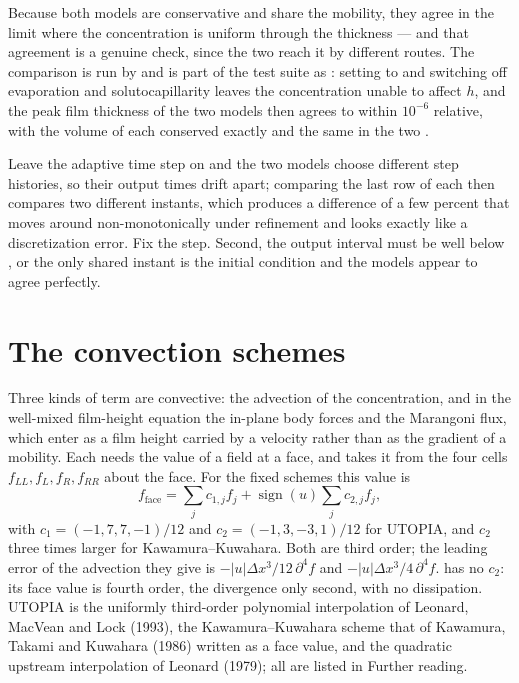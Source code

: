 Because both models are conservative and share the mobility, they agree in the
limit where the concentration is uniform through the thickness --- and that
agreement is a genuine check, since the two reach it by different routes. The
comparison is run by  and is part of the test
suite as : setting  to 
and switching off evaporation and solutocapillarity leaves the concentration
unable to affect $h$, and the peak film thickness of the two models then agrees
to within $10^{-6}$ relative, with the volume of each conserved exactly and
the same in the two .

\begin{note}
Leave the adaptive time step on and the two models choose different step
histories, so their output times drift apart; comparing the last row of each
 then compares two different instants, which produces a
difference of a few percent that moves around non-monotonically under
refinement and looks exactly like a discretization error. Fix the step. Second,
the output interval must be well below , or the only shared
instant is the initial condition and the models appear to agree perfectly.
\end{note}

\section{The convection schemes}
\label{sec:disc:convection}

Three kinds of term are convective: the advection of the concentration, and
in the well-mixed film-height equation the in-plane body forces and the
Marangoni flux, which enter as a film height carried by a velocity rather than
as the gradient of a mobility. Each needs the value of a field at a face, and
takes it from the four cells $f_{LL}, f_L, f_R, f_{RR}$ about the face. For
the fixed schemes this value is
%
\begin{equation}
  f_{\text{face}} = \sum_j c_{1,j} f_j + \operatorname{sign}(u)\sum_j c_{2,j} f_j ,
  \label{eq:disc:face}
\end{equation}
%
with $c_1 = (-1, 7, 7, -1)/12$ and $c_2 = (-1, 3, -3, 1)/12$ for UTOPIA, and
$c_2$ three times larger for Kawamura--Kuwahara. Both are third order; the
leading error of the advection they give is $-|u|\Delta x^3/12\,\partial^4 f$
and $-|u|\Delta x^3/4\,\partial^4 f$.  has no $c_2$: its face
value is fourth order, the divergence only second, with no dissipation.
UTOPIA is the uniformly third-order polynomial interpolation of Leonard,
MacVean and Lock (1993), the Kawamura--Kuwahara scheme that of Kawamura,
Takami and Kuwahara (1986) written as a face value, and  the
quadratic upstream interpolation of Leonard (1979); all are listed in Further
reading.

